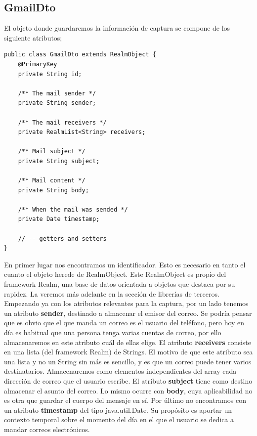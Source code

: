 \documentclass[12pt,a4paper,oneside]{book} %
\begin{document}
\subsection{GmailDto}
El objeto donde guardaremos la información de captura se compone de los siguiente atributos; 
\begin{verbatim}
public class GmailDto extends RealmObject {
 	@PrimaryKey
    private String id;

    /** The mail sender */
    private String sender;

    /** The mail receivers */
    private RealmList<String> receivers;

    /** Mail subject */
    private String subject;

    /** Mail content */
    private String body;

    /** When the mail was sended */
    private Date timestamp;
 	
 	// -- getters and setters   
}
\end{verbatim}
En primer lugar nos encontramos un identificador. Esto es necesario en tanto el cuanto el objeto herede de RealmObject. Este RealmObject es propio del framework Realm, una base de datos orientada a objetos que destaca por su rapidez. La veremos más adelante en la sección de librerías de terceros. 
\newline \newline 
Empezando ya con los atributos relevantes para la captura, por un lado tenemos un atributo \textbf{sender}, destinado a almacenar el emisor del correo. Se podría pensar que es obvio que el que manda un correo es el usuario del teléfono, pero hoy en día es habitual que una persona tenga varias cuentas de correo, por ello almacenaremos en este atributo cuál de ellas elige. 
\newline \newline 
El atributo \textbf{receivers} consiste en una lista (del framework Realm) de Strings. El motivo de que este atributo sea una lista y no un String sin más es sencillo, y es que un correo puede tener varios destinatarios. Almacenaremos como elementos independientes del array cada dirección de correo que el usuario escribe. 
\newline \newline 
El atributo \textbf{subject} tiene como destino almacenar el asunto del correo. Lo mismo ocurre con \textbf{body}, cuya aplicabilidad no es otra que guardar el cuerpo del mensaje en sí. 
\newline \newline 
Por último no encontramos con un atributo \textbf{timestamp} del tipo java.util.Date. Su propósito es aportar un contexto temporal sobre el momento del día en el que el usuario se dedica a mandar correos electrónicos. 
\end{document}

